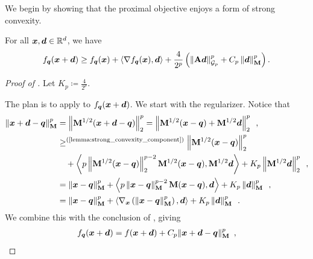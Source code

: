 We begin by showing that the proximal objective enjoys a form of strong convexity.
\begin{lemma}
\label{lemma:fq_strongly_convex}
For all $\bm{x},\bm{d}\in\mathbb{R}^d$, we have
\begin{align*}
    f_{\bm{q}}(\bm{x}+\bm{d}) \ge f_{\bm{q}}(\bm{x}) + \left\langle \nabla f_{\bm{q}}(\bm{x}), \bm{d} \right\rangle + \frac{4}{2^p}\left(\left\lVert \mathbf{A}\bm{d} \right\rVert_{\mathcal{G}_{p}}^p + C_p\left\lVert \bm{d} \right\rVert_{\mathbf{M}}^p\right).
\end{align*}
\end{lemma}
\begin{proof}[Proof of ]
Let $K_p \coloneqq \frac{4}{2^p}$.

The plan is to apply  to $f_{\bm{q}}(\bm{x}+\bm{d})$. We start with the regularizer. Notice that
\begin{align}
    \norm{\vx+\vd-\vq}_{\mM}^p &= \norm{\mM^{1/2}(\vx+\vd-\vq)}_2^p = \norm{\mM^{1/2}(\vx-\vq) + \mM^{1/2}\vd}_2^p\enspace,\nonumber \\
    &\ge^{\text{(\Cref{lemma:strong_convexity_component})}} \norm{\mM^{1/2}(\vx-\vq)}_2^p \\
    &\quad + \ip{p\norm{\mM^{1/2}(\vx-\vq)}_2^{p-2}\mM^{1/2}(\vx-\vq),\mM^{1/2}\vd} + K_p\norm{\mM^{1/2}\vd}_2^p\enspace,\nonumber\\
    &= \norm{\vx-\vq}_{\mM}^p + \ip{p\norm{\vx-\vq}_{\mM}^{p-2}\mM(\vx-\vq), \vd} + K_p\norm{\vd}_{\mM}^p\enspace,\nonumber\\
    &= \norm{\vx-\vq}_{\mM}^p + \ip{\nabla_{\vx} \inparen{\norm{\vx-\vq}_{\mM}^p}, \vd} + K_p\norm{\vd}_{\mM}^p\enspace.\label{eq:M_norm_sc}
\end{align}
We combine this with the conclusion of , giving
\begin{align*}
    f_{\vq}(\vx+\vd) &= f(\vx+\vd) + C_p\|\vx+\vd - \vq\|_{\mM}^p\enspace,\\

\end{align*}
\end{proof}
